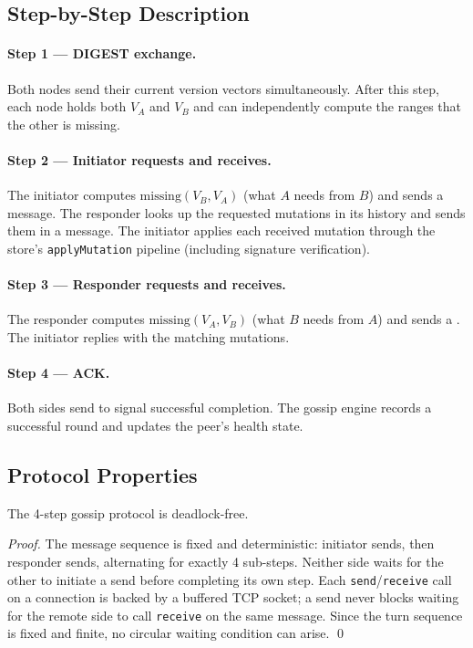 \subsection{Step-by-Step Description}

\paragraph{Step 1 — DIGEST exchange.}
Both nodes send their current version vectors simultaneously. After this step,
each node holds both $V_A$ and $V_B$ and can independently compute the ranges
that the other is missing.

\paragraph{Step 2 — Initiator requests and receives.}
The initiator computes $\mathrm{missing}(V_B, V_A)$ (what $A$ needs from $B$)
and sends a  message. The responder looks up the requested
mutations in its history and sends them in a  message. The
initiator applies each received mutation through the store's
\texttt{applyMutation} pipeline (including signature verification).

\paragraph{Step 3 — Responder requests and receives.}
The responder computes $\mathrm{missing}(V_A, V_B)$ (what $B$ needs from $A$)
and sends a . The initiator replies with the matching mutations.

\paragraph{Step 4 — ACK.}
Both sides send  to signal successful completion. The gossip engine
records a successful round and updates the peer's health state.

\subsection{Protocol Properties}

\begin{theorem}
\label{thm:deadlock-free}
The 4-step gossip protocol is deadlock-free.
\end{theorem}

\begin{proof}
The message sequence is fixed and deterministic: initiator sends, then
responder sends, alternating for exactly 4 sub-steps. Neither side waits for
the other to initiate a send before completing its own step. Each
\texttt{send}/\texttt{receive} call on a connection is backed by a buffered
TCP socket; a send never blocks waiting for the remote side to call \texttt{receive}
on the same message. Since the turn sequence is fixed and finite, no circular
waiting condition can arise. \qed
\end{proof}

